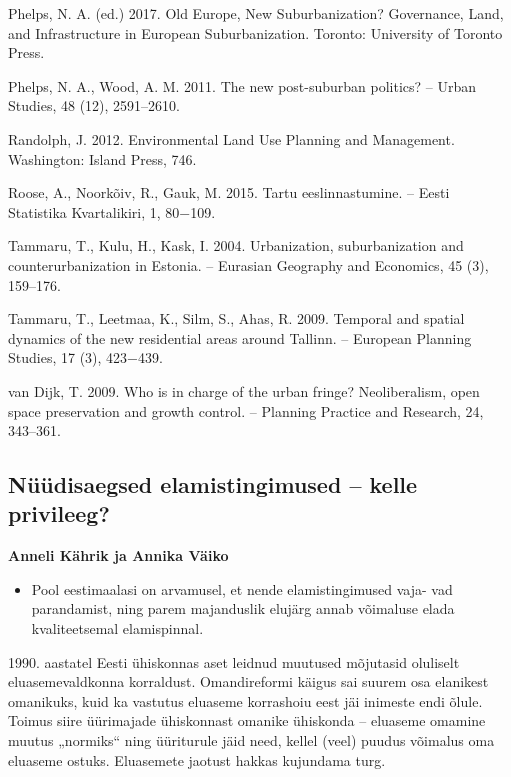 \documentclass[estonian,]{article}
\providecommand{\tightlist}{%
  \setlength{\itemsep}{0pt}\setlength{\parskip}{0pt}}
\begin{document}
Phelps, N. A. (ed.) 2017. Old Europe, New Suburbanization? Governance, Land, and Infrastructure in European Suburbanization. Toronto: University of Toronto Press.

Phelps, N. A., Wood, A. M. 2011. The new post-suburban politics? -- Urban Studies, 48 (12), 2591--2610.

Randolph, J. 2012. Environmental Land Use Planning and Management. Washington: Island Press, 746.

Roose, A., Noorkõiv, R., Gauk, M. 2015. Tartu eeslinnastumine. -- Eesti Statistika Kvartalikiri, 1, 80−109.

Tammaru, T., Kulu, H., Kask, I. 2004. Urbanization, suburbanization and counterurbanization in Estonia. -- Eurasian Geography and Economics, 45 (3), 159--176.

Tammaru, T., Leetmaa, K., Silm, S., Ahas, R. 2009. Temporal and spatial dynamics of the new residential areas around Tallinn. -- European Planning Studies, 17 (3), 423−439.

van Dijk, T. 2009. Who is in charge of the urban fringe? Neoliberalism, open space preservation and growth control. -- Planning Practice and Research, 24, 343--361.

\hypertarget{nuxfcuxfcdisaegsed-elamistingimused-kelle-privileeg}{%
\subsection{Nüüdisaegsed elamistingimused -- kelle privileeg?}\label{nuxfcuxfcdisaegsed-elamistingimused-kelle-privileeg}}

\begin{authors}
\textbf{Anneli Kährik ja Annika Väiko}
\end{authors}

\begin{points}
\begin{itemize}
\tightlist
\item
  Pool eestimaalasi on arvamusel, et nende elamistingimused vaja- vad
  parandamist, ning parem majanduslik elujärg annab võimaluse elada
  kvaliteetsemal elamispinnal.
\end{itemize}
\end{points}

1990. aastatel Eesti ühiskonnas aset leidnud muutused mõjutasid oluliselt eluasemevaldkonna korraldust. Omandireformi käigus sai suurem osa elanikest omanikuks, kuid ka vastutus eluaseme korrashoiu eest jäi inimeste endi õlule. Toimus siire üürimajade ühiskonnast omanike ühiskonda -- eluaseme omamine muutus „normiks`` ning üüriturule jäid need, kellel (veel) puudus võimalus oma eluaseme ostuks. Eluasemete jaotust hakkas kujundama turg.
\end{document}
